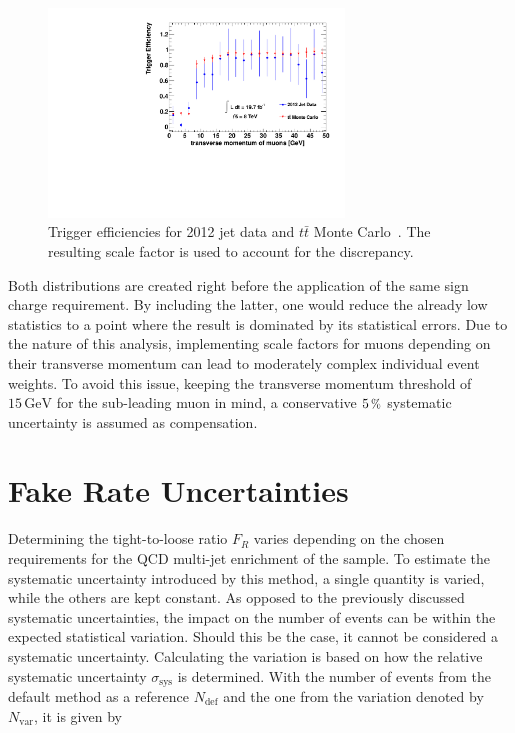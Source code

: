 \begin{figure}[!htb]
  \centering
  \includegraphics[width=0.7\textwidth]{plots/trigger_eff.pdf}
  \caption{Trigger efficiencies for 2012 jet data and $t\bar{t}$ Monte Carlo~\cite{teyssier}. The resulting scale factor is used to account for the discrepancy.}
  \label{fig:triggereff}
\end{figure}

Both distributions are created right before the application of the same sign charge requirement. By including the latter, one would reduce the already low statistics to a point where the result is dominated by its statistical errors. Due to the nature of this analysis, implementing scale factors for muons depending on their transverse momentum can lead to moderately complex individual event weights. To avoid this issue, keeping the transverse momentum threshold of $15\,\text{GeV}$ for the sub-leading muon in mind, a conservative $5\,\pct$ systematic uncertainty is assumed as compensation.

\section{Fake Rate Uncertainties}
\label{sec:tlsys}

Determining the tight-to-loose ratio $F_R$ varies depending on the chosen requirements for the QCD multi-jet enrichment of the sample. To estimate the systematic uncertainty introduced by this method, a single quantity is varied, while the others are kept constant. As opposed to the previously discussed systematic uncertainties, the impact on the number of events can be within the expected statistical variation. Should this be the case, it cannot be considered a systematic uncertainty. Calculating the variation is based on how the relative systematic uncertainty $\sigma_{\text{sys}}$ is determined. With the number of events from the default method as a reference $N_{\text{def}}$ and the one from the variation denoted by $N_{\text{var}}$, it is given by

